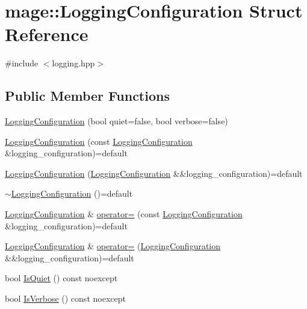 \hypertarget{structmage_1_1_logging_configuration}{}\section{mage\+:\+:Logging\+Configuration Struct Reference}
\label{structmage_1_1_logging_configuration}


{\ttfamily \#include $<$logging.\+hpp$>$}

\subsection*{Public Member Functions}
\begin{DoxyCompactItemize}
\item 
\hyperlink{structmage_1_1_logging_configuration_ab18d18c78e7104f4c677e6d08f31ca01}{Logging\+Configuration} (bool quiet=false, bool verbose=false)
\item 
\hyperlink{structmage_1_1_logging_configuration_a8e4ccd4301f5544213edd3b600cccff9}{Logging\+Configuration} (const \hyperlink{structmage_1_1_logging_configuration}{Logging\+Configuration} \&logging\+\_\+configuration)=default
\item 
\hyperlink{structmage_1_1_logging_configuration_ad5d3dd901720450fcf57d4b1b32fce15}{Logging\+Configuration} (\hyperlink{structmage_1_1_logging_configuration}{Logging\+Configuration} \&\&logging\+\_\+configuration)=default
\item 
\hyperlink{structmage_1_1_logging_configuration_a842cd1d5cf22c9fb6e2c76e684cd08ee}{$\sim$\+Logging\+Configuration} ()=default
\item 
\hyperlink{structmage_1_1_logging_configuration}{Logging\+Configuration} \& \hyperlink{structmage_1_1_logging_configuration_af35d0b0a2f5743944d3d9d66580074db}{operator=} (const \hyperlink{structmage_1_1_logging_configuration}{Logging\+Configuration} \&logging\+\_\+configuration)=default
\item 
\hyperlink{structmage_1_1_logging_configuration}{Logging\+Configuration} \& \hyperlink{structmage_1_1_logging_configuration_a699285ff50d1bb7573cc0c28bcf476b1}{operator=} (\hyperlink{structmage_1_1_logging_configuration}{Logging\+Configuration} \&\&logging\+\_\+configuration)=default
\item 
bool \hyperlink{structmage_1_1_logging_configuration_a64f7a7b45bc0e896b9d493ddaf13ca82}{Is\+Quiet} () const noexcept
\item 
bool \hyperlink{structmage_1_1_logging_configuration_a4ad7dc55f8d105c1125adcea4796bb3b}{Is\+Verbose} () const noexcept
\end{DoxyCompactItemize}
